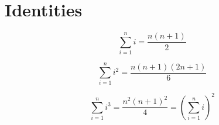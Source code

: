 \section{Identities}


$$ \sum_{i=1}^{n} i = \frac{n(n+1)}{2}  $$

$$\sum_{i=1}^{n} i^{2} = \frac{n(n+1)(2n+1)}{6}  $$

$$\sum_{i=1}^{n} i^{3} = \frac{n^{2}(n+1)^{2}}{4} = \left(\sum_{i=1}^n i\right)^2$$

